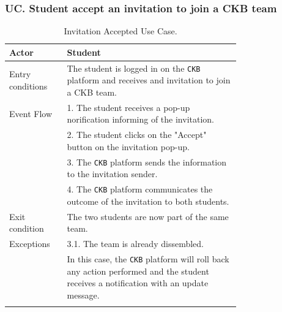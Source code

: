 \subsubsection*{UC\cuc . Student accept an invitation to join a CKB team}
\begin{center}
    \begin{longtable}{lp{0.75\linewidth}}
        \hline
        Actor            & Student                                                                                                                                                                               \\
        \hline
        Entry conditions & The student is logged in on the \verb|CKB| platform and receives and invitation to join a CKB team.                                                                                                               \\
        \hline
        Event Flow       
        & 1. The student receives a pop-up norification informing of the invitation.\\
        & 2. The student clicks on the "Accept" button on the invitation pop-up.\\
        & 3. The \verb|CKB| platform sends the information to the invitation sender.\\
        & 4. The \verb|CKB| platform communicates the outcome of the invitation to both students.\\
        \hline
        Exit condition   & The two students are now part of the same team.\\                                                                                                                                                                           
        \hline
        Exceptions   
        & 3.1. The team is already dissembled.\\                                          
            & In this case, the \verb|CKB| platform will roll back any action performed and the student receives a notification with an update message.\\                                                               
        \hline
        \caption{Invitation Accepted Use Case.}
        \label{tab: invitation_accepted_use_case}
    \end{longtable}

\end{center}

